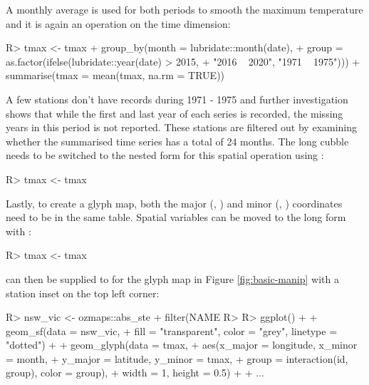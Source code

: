 \documentclass[
]{jss}
\begin{document}
A monthly average is used for both periods to smooth the maximum
temperature and it is again an operation on the time dimension:

\begin{CodeChunk}
\begin{CodeInput}
R> tmax <- tmax %
+   group_by(month = lubridate::month(date), 
+          group = as.factor(ifelse(lubridate::year(date) > 2015, 
+                                   "2016 ~ 2020", "1971 ~ 1975"))) %
+   summarise(tmax = mean(tmax, na.rm = TRUE))
\end{CodeInput}
\end{CodeChunk}

A few stations don't have records during 1971 - 1975 and further
investigation shows that while the first and last year of each series is
recorded, the missing years in this period is not reported. These
stations are filtered out by examining whether the summarised time
series has a total of 24 months. The long cubble needs to be switched to
the nested form for this spatial operation using :

\begin{CodeChunk}
\begin{CodeInput}
R> tmax <- tmax %
\end{CodeInput}
\end{CodeChunk}

Lastly, to create a glyph map, both the major (,
) and minor (, ) coordinates need
to be in the same table. Spatial variables can be moved to the long form
with :

\begin{CodeChunk}
\begin{CodeInput}
R> tmax <- tmax %
\end{CodeInput}
\end{CodeChunk}

 can then be supplied to  for the glyph
map in Figure \ref{fig:basic-manip} with a station inset on the top left
corner:

\begin{CodeChunk}
\begin{CodeInput}
R> nsw_vic <- ozmaps::abs_ste %
+   filter(NAME %
R> 
R> ggplot() + 
+   geom_sf(data = nsw_vic, 
+           fill = "transparent", color = "grey", linetype = "dotted") + 
+   geom_glyph(data = tmax, 
+              aes(x_major = longitude, x_minor = month, 
+                  y_major = latitude, y_minor = tmax,
+                  group = interaction(id, group), color = group),
+              width = 1, height = 0.5) +
+   ...
\end{CodeInput}
\end{CodeChunk}
\end{document}
